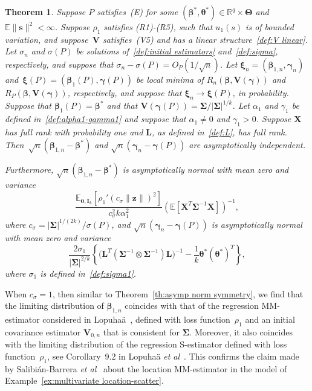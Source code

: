 \documentclass{article}
\numberwithin{equation}{section}
\theoremstyle{plain}
\newtheorem{theorem}{Theorem}
\newcommand{\R}{\mathbb{R}}
\newcommand{\bbeta}{\bm\beta}
\newcommand{\btheta}{\bm\theta}
\newcommand{\bxi}{\bm\xi}
\newcommand{\bgamma}{\bm\gamma}
\newcommand{\bSigma}{\mathbf{\Sigma}}
\newcommand{\bTheta}{\bm\Theta}
\newcommand{\bs}{\mathbf{s}}
\newcommand{\bz}{\mathbf{z}}
\newcommand{\bX}{\mathbf{X}}
\newcommand{\bV}{\mathbf{V}}
\newcommand{\bI}{\mathbf{I}}
\newcommand{\bL}{\mathbf{L}}
\newcommand{\E}{\mathbb{E}}
\begin{document}
\begin{theorem}
\label{th:asymp norm elliptical}
Suppose $P$ satisfies~(E) for some $(\bbeta^*,\btheta^*)\in\R^q\times\bTheta$
and~$\E\|\bs\|^2<\infty$.
Suppose $\rho_1$ satisfies (R1)-(R5), such that $u_1(s)$ is of bounded variation,
and suppose~$\bV$ satisfies~(V5) and has a linear structure~\eqref{def:V linear}.
Let $\sigma_n$ and $\sigma(P)$ be solutions of~\eqref{def:initial estimators} and~\eqref{def:sigma}, respectively,
and suppose that $\sigma_n-\sigma(P)=O_P(1/\sqrt{n})$.
Let $\bxi_n=(\bbeta_{1,n},\bgamma_n)$ and~$\bxi(P)=(\bbeta_1(P),\bgamma(P))$ be local minima of $R_n(\bbeta,\bV(\bgamma))$ and 
$R_P(\bbeta,\bV(\bgamma))$, respectively, 
and suppose that $\bxi_n\to\bxi(P)$, in probability.
Suppose that $\bbeta_1(P)=\bbeta^*$ and that $\bV(\bgamma(P))=\bSigma/|\bSigma|^{1/k}$.
Let $\alpha_1$ and $\gamma_1$ be defined in~\eqref{def:alpha1-gamma1}
and suppose that $\alpha_1\ne0$ and $\gamma_1>0$.
Suppose $\bX$ has full rank with probability one
and $\bL$, as defined in~\eqref{def:L}, has full rank.
Then~$\sqrt{n}(\bbeta_{1,n}-\bbeta^*)$ and $\sqrt{n}(\bgamma_n-\bgamma(P))$ are 
asymptotically independent.

Furthermore, $\sqrt{n}(\bbeta_{1,n}-\bbeta^*)$ is asymptotically normal with mean zero and variance
\[
\frac{\E_{\mathbf{0},\bI_k}\left[\rho_1'(c_\sigma\|\bz\|)^2\right]}{c_\sigma^2k\alpha_1^2}
\left(
\mathbb{E}\left[\mathbf{X}^T\bSigma^{-1}\mathbf{X}\right]
\right)^{-1},
\]
where $c_\sigma=|\bSigma|^{1/(2k)}/\sigma(P)$,
and $\sqrt{n}(\bgamma_n-\bgamma(P))$ is asymptotically normal with mean zero and variance
\[
\frac{2\sigma_1}{|\bSigma|^{2/k}}
\left\{
\Big(\bL^T\left(\bSigma^{-1}\otimes\bSigma^{-1}\right)\bL\Big)^{-1}
-
\frac{1}{k}\btheta^*(\btheta^*)^T
\right\},
\]
where $\sigma_1$ is defined in~\eqref{def:sigma1}.
\end{theorem}
When $c_\sigma=1$, 
then similar to Theorem~\ref{th:asymp norm symmetry}, we find that the limiting distribution of 
$\bbeta_{1,n}$ coincides with that of the regression MM-estimator considered in Lopuha\"a~\cite{lopuhaa2023},
defined with loss function~$\rho_1$ and an initial covariance estimator $\bV_{0,n}$ that is consistent for $\bSigma$.
Moreover, it also coincides with the limiting distribution of the regression S-estimator defined with loss function~$\rho_1$,
see Corollary~9.2 in Lopuha\"a \emph{et al}~\cite{lopuhaa-gares-ruizgazen2023}.
This confirms the claim made by Salibi\'an-Barrera \emph{et al}~\cite{SalibianBarrera-VanAelst-Willems2006}
about the location MM-estimator in the model of Example~\ref{ex:multivariate location-scatter}.
\end{document}
